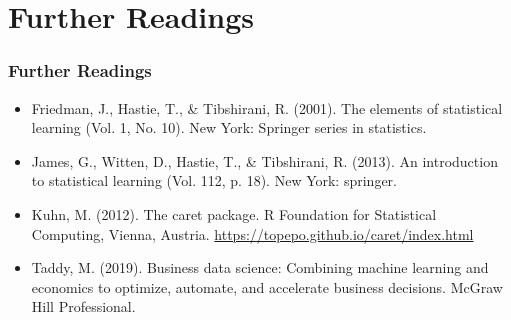 \documentclass[
  shownotes,
  xcolor={svgnames},
  hyperref={colorlinks,citecolor=DarkBlue,linkcolor=DarkRed,urlcolor=DarkBlue}
  , aspectratio=169]{beamer}
\begin{document}
\section{Further Readings}
\begin{frame}
\frametitle{Further Readings}

\begin{itemize}


  \item Friedman, J., Hastie, T., \& Tibshirani, R. (2001). The elements of statistical learning (Vol. 1, No. 10). New York: Springer series in statistics.
  \medskip
  \item James, G., Witten, D., Hastie, T., \& Tibshirani, R. (2013). An introduction to statistical learning (Vol. 112, p. 18). New York: springer.
  \medskip
  \item Kuhn, M. (2012). The caret package. R Foundation for Statistical Computing, Vienna, Austria. \url{https://topepo.github.io/caret/index.html}
  \medskip
  \item Taddy, M. (2019). Business data science: Combining machine learning and economics to optimize, automate, and accelerate business decisions. McGraw Hill Professional.

  
\end{itemize}

\end{frame}

\end{document}

